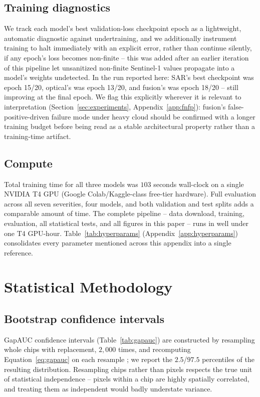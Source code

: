 \documentclass{article}
\begin{document}
\subsection{Training diagnostics}
We track each model's best validation-loss checkpoint epoch as a lightweight, automatic diagnostic against undertraining, and we additionally instrument training to halt immediately with an explicit error, rather than continue silently, if any epoch's loss becomes non-finite -- this was added after an earlier iteration of this pipeline let unsanitized non-finite Sentinel-1 values propagate into a model's weights undetected. In the run reported here: SAR's best checkpoint was epoch 15/20, optical's was epoch 13/20, and fusion's was epoch 18/20 -- still improving at the final epoch. We flag this explicitly wherever it is relevant to interpretation (Section~\ref{sec:experiments}, Appendix~\ref{app:fnfp}): fusion's false-positive-driven failure mode under heavy cloud should be confirmed with a longer training budget before being read as a stable architectural property rather than a training-time artifact.

\subsection{Compute}
Total training time for all three models was $103$ seconds wall-clock on a single NVIDIA T4 GPU (Google Colab/Kaggle-class free-tier hardware). Full evaluation across all seven severities, four models, and both validation and test splits adds a comparable amount of time. The complete pipeline -- data download, training, evaluation, all statistical tests, and all figures in this paper -- runs in well under one T4 GPU-hour. Table~\ref{tab:hyperparams} (Appendix~\ref{app:hyperparams}) consolidates every parameter mentioned across this appendix into a single reference.

\section{Statistical Methodology}
\label{app:stats}

\subsection{Bootstrap confidence intervals}
GapAUC confidence intervals (Table~\ref{tab:gapauc}) are constructed by resampling whole chips with replacement, $2{,}000$ times, and recomputing Equation~\ref{eq:gapauc} on each resample \citep{efron1993bootstrap}; we report the $2.5$/$97.5$ percentiles of the resulting distribution. Resampling chips rather than pixels respects the true unit of statistical independence -- pixels within a chip are highly spatially correlated, and treating them as independent would badly understate variance.
\end{document}
